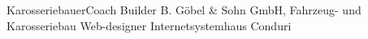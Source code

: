 \section{\internships}
    {\ifgerman Karosseriebauer\else Coach Builder\fi}
    {\newline{}B. Göbel \& Sohn GmbH, Fahrzeug- und Karosseriebau}
    {}{}{}
    {Web-designer}
    {\newline{}Internetsystemhaus Conduri}{}{}{}